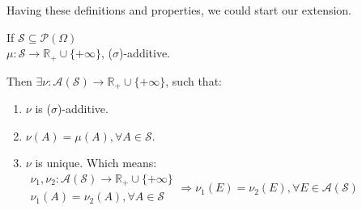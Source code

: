 Having these definitions and properties, we could start our extension.
\begin{theorem}
  If $\mathcal{S}\subseteq\mathcal{P}(\Omega)$\\
  $\mu : \mathcal{S} \to \mathbb{R}_+\cup\{+\infty\}$, ($\sigma$)-additive.

  Then $\exists \nu : \mathcal{A}(\mathcal{S}) \to \mathbb{R}_+\cup\{+\infty\}$, such that:
  \begin{enumerate}
  \item $\nu$ is ($\sigma$)-additive.
  \item $\nu(A) = \mu(A), \forall A\in\mathcal{S}$.
  \item $\nu$ is unique. Which means:\\
  \( \substack{
      \nu_1, \nu_2 : \mathcal{A}(\mathcal{S}) \to \mathbb{R}_+\cup\{+\infty\} \\
      \nu_1(A) = \nu_2(A), \forall A\in \mathcal{S}
  } \Rightarrow \nu_1(E) = \nu_2(E), \forall E\in\mathcal{A}(\mathcal{S})\)
  \end{enumerate}
\end{theorem}
